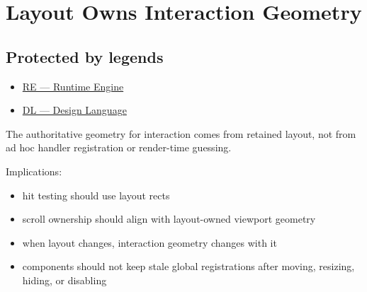 \chapter{Layout Owns Interaction Geometry}\label{record-050}

\smallskip

\section{Protected by legends}\label{record-050-protected-by-legends}

\begin{itemize}
\tightlist
\item
  \href{https://github.com/flyingrobots/bijou/blob/1853ad902f6bf219326409e7f743a5a1d6517dbc/docs/legends/RE-runtime-engine.md}{RE --- Runtime Engine}
\item
  \href{https://github.com/flyingrobots/bijou/blob/1853ad902f6bf219326409e7f743a5a1d6517dbc/docs/legends/DL-design-language.md}{DL --- Design Language}
\end{itemize}

The authoritative geometry for interaction comes from retained layout, not from ad hoc handler registration or render-time guessing.

Implications:

\begin{itemize}
\tightlist
\item
  hit testing should use layout rects
\item
  scroll ownership should align with layout-owned viewport geometry
\item
  when layout changes, interaction geometry changes with it
\item
  components should not keep stale global registrations after moving, resizing, hiding, or disabling
\end{itemize}

